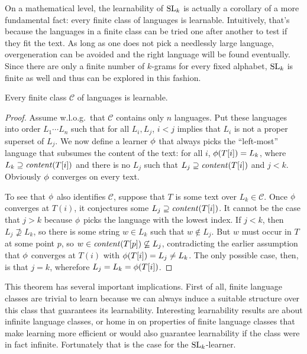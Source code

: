 On a mathematical level, the learnability of $\mathrm{SL}_k$ is actually a corollary of a more fundamental fact: every finite class of languages is learnable.
Intuitively, that's because the languages in a finite class can be tried one after another to test if they fit the text.
As long as one does not pick a needlessly large language, overgeneration can be avoided and the right language will be found eventually.
Since there are only a finite number of $k$-grams for every fixed alphabet, $\mathrm{SL}_k$ is finite as well and thus can be explored in this fashion.
%
\begin{theorem}
    Every finite class $\mathcal{C}$ of languages is learnable.
\end{theorem}
%
\begin{proof}
    Assume w.l.o.g.\ that $\mathcal{C}$ contains only $n$ languages. 
    Put these languages into order $L_1 \cdots L_n$ such that for all $L_i, L_j$, $i < j$ implies that $L_i$ is not a proper superset of $L_j$.
    We now define a learner $\phi$ that always picks the ``left-most'' language that subsumes the content of the text: for all $i$, $\phi(T[i]) = L_k$, where $L_k \supseteq \mathit{content}(T[i])$ and there is no $L_j$ such that $L_j \supseteq \mathit{content}(T[i])$ and $j < k$.
    Obviously $\phi$ converges on every text.

    To see that $\phi$ also identifies $\mathcal{C}$, suppose that $T$ is some text over $L_k \in \mathcal{C}$.
    Once $\phi$ converges at $T(i)$, it conjectures some $L_j \supseteq \mathit{content}(T[i])$.
    It cannot be the case that $j > k$ because $\phi$ picks the language with the lowest index.
    If $j < k$, then $L_j \not\supseteq L_k$, so there is some string $w \in L_k$ such that $w \notin L_j$.
    But $w$ must occur in $T$ at some point $p$, so $w \in \mathit{content}(T[p]) \not\subseteq L_j$, contradicting the earlier assumption that $\phi$ converges at $T(i)$ with $\phi(T[i]) = L_j \neq L_k$.
    The only possible case, then, is that $j = k$, wherefore $L_j = L_k = \phi(T[i])$.
\end{proof}
%
This theorem has several important implications.
First of all, finite language classes are trivial to learn because we can always induce a suitable structure over this class that guarantees its learnability.
Interesting learnability results are about infinite language classes, or home in on properties of finite language classes that make learning more efficient or would also guarantee learnability if the class were in fact infinite.
Fortunately that is the case for the $\mathrm{SL}_k$-learner.

